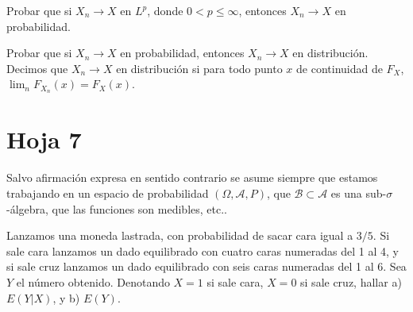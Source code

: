 
\begin{problem}[4] Probar que si $X_n\to  X$ en $L^p$, donde  $0 < p \le \infty$, entonces $X_n\to  X$ en probabilidad.
\solution

\begin{expla}

\end{expla}

\end{problem}


\begin{problem}[5] Probar que si $X_n\to  X$ en  probabilidad, entonces $X_n\to  X$ en distribuci\'on. Decimos que
 $X_n\to  X$ en distribuci\'on si para todo punto $x$ de continuidad de $F_X$, $\lim_n F_{X_n} (x) = F_X (x)$.
\solution

\begin{expla}

\end{expla}

\end{problem}



\newpage
\section{Hoja 7}

Salvo afirmaci\'on expresa en sentido
contrario se asume siempre que estamos trabajando en un espacio de probabilidad $(\Omega, \mathcal{A}, P)$,
que  $\mathcal{B}\subset \mathcal{A}$ es una sub-$\sigma$-\'algebra, que las funciones son medibles, etc..


\begin{problem}[1] Lanzamos una moneda lastrada, con probabilidad de sacar cara
igual a $3/5$. Si sale cara lanzamos un dado equilibrado con cuatro
caras numeradas del 1 al 4, y si sale cruz lanzamos un dado
equilibrado con seis caras numeradas del 1 al 6. Sea $Y$ el n\'umero
obtenido. Denotando $X=1$ si sale cara, $X=0$ si sale cruz, hallar
a) $E(Y|X)$, y  b) $E(Y)$.
\solution

\begin{expla}

\end{expla}

\end{problem}


